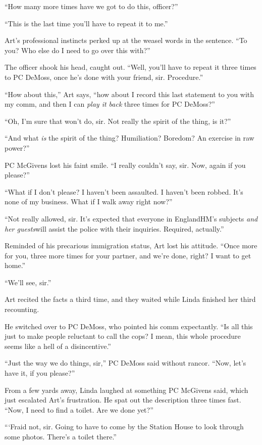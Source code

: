 “How many more times have we got to do this, officer?”

“This is the last time you’ll have to repeat it to me.”

Art’s professional instincts perked up at the weasel words in the
sentence. “To you? Who else do I need to go over this with?”

The officer shook his head, caught out. “Well, you’ll have to
repeat it three times to PC DeMoss, once he’s done with your
friend, sir. Procedure.”

“How about this,” Art says, “how about I record this last statement
to you with my comm, and then I can \emph{play it back} three times
for PC DeMoss?”

“Oh, I’m sure that won’t do, sir. Not really the spirit of the
thing, is it?”

“And what \emph{is} the spirit of the thing? Humiliation? Boredom?
An exercise in raw power?”

PC McGivens lost his faint smile. “I really couldn’t say, sir. Now,
again if you please?”

“What if I don’t please? I haven’t been assaulted. I haven’t been
robbed. It’s none of my business. What if I walk away right now?”

“Not really allowed, sir. It’s expected that everyone in
England{\dash}HM’s subjects \emph{and her guests}{\dash}will assist the police
with their inquiries. Required, actually.”

Reminded of his precarious immigration status, Art lost his
attitude. “Once more for you, three more times for your partner,
and we’re done, right? I want to get home.”

“We’ll see, sir.”

Art recited the facts a third time, and they waited while Linda
finished her third recounting.

He switched over to PC DeMoss, who pointed his comm expectantly.
“Is all this just to make people reluctant to call the cops? I
mean, this whole procedure seems like a hell of a disincentive.”

“Just the way we do things, sir,” PC DeMoss said without rancor.
“Now, let’s have it, if you please?”

From a few yards away, Linda laughed at something PC McGivens said,
which just escalated Art’s frustration. He spat out the description
three times fast. “Now, I need to find a toilet. Are we done yet?”

“‘Fraid not, sir. Going to have to come by the Station House to
look through some photos. There’s a toilet there.”

